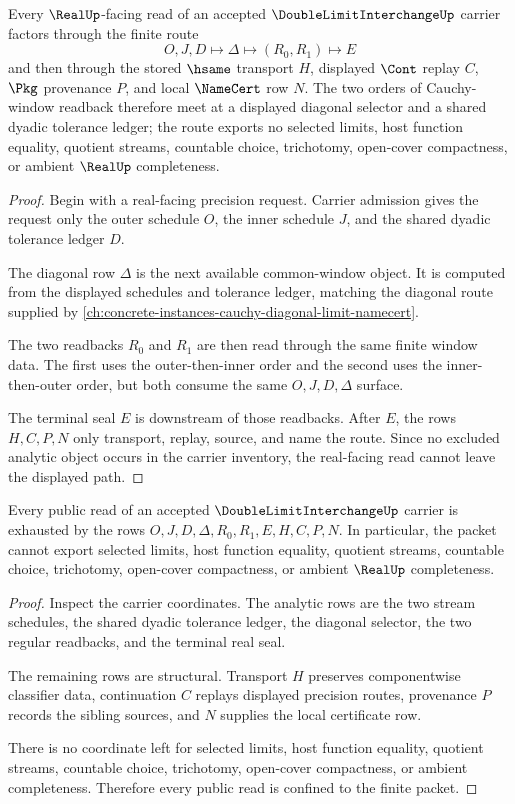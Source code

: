 \begin{theorem}
\label{thm:double-limit-interchange-diagonal-route}
Every $\RealUp$-facing read of an accepted $\DoubleLimitInterchangeUp$ carrier factors through the finite route
$$
O,J,D \longmapsto \Delta \longmapsto (R_0,R_1) \longmapsto E
$$
and then through the stored $\hsame$ transport $H$, displayed $\Cont$ replay $C$, $\Pkg$ provenance $P$, and local $\NameCert$ row $N$. The two orders of Cauchy-window readback therefore meet at a displayed diagonal selector and a shared dyadic tolerance ledger; the route exports no selected limits, host function equality, quotient streams, countable choice, trichotomy, open-cover compactness, or ambient $\RealUp$ completeness.
\end{theorem}
\begin{proof}
Begin with a real-facing precision request. Carrier admission gives the request only the outer schedule $O$, the inner schedule $J$, and the shared dyadic tolerance ledger $D$.

The diagonal row $\Delta$ is the next available common-window object. It is computed from the displayed schedules and tolerance ledger, matching the diagonal route supplied by \autoref{ch:concrete-instances-cauchy-diagonal-limit-namecert}.

The two readbacks $R_0$ and $R_1$ are then read through the same finite window data. The first uses the outer-then-inner order and the second uses the inner-then-outer order, but both consume the same $O,J,D,\Delta$ surface.

The terminal seal $E$ is downstream of those readbacks. After $E$, the rows $H,C,P,N$ only transport, replay, source, and name the route. Since no excluded analytic object occurs in the carrier inventory, the real-facing read cannot leave the displayed path.
\end{proof}

\begin{theorem}
\label{thm:double-limit-interchange-nonescape}
Every public read of an accepted $\DoubleLimitInterchangeUp$ carrier is exhausted by the rows $O,J,D,\Delta,R_0,R_1,E,H,C,P,N$. In particular, the packet cannot export selected limits, host function equality, quotient streams, countable choice, trichotomy, open-cover compactness, or ambient $\RealUp$ completeness.
\end{theorem}
\begin{proof}
Inspect the carrier coordinates. The analytic rows are the two stream schedules, the shared dyadic tolerance ledger, the diagonal selector, the two regular readbacks, and the terminal real seal.

The remaining rows are structural. Transport $H$ preserves componentwise classifier data, continuation $C$ replays displayed precision routes, provenance $P$ records the sibling sources, and $N$ supplies the local certificate row.

There is no coordinate left for selected limits, host function equality, quotient streams, countable choice, trichotomy, open-cover compactness, or ambient completeness. Therefore every public read is confined to the finite packet.
\end{proof}

